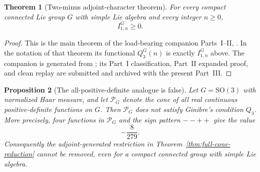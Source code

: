 \documentclass[11pt,reqno]{amsart}
\theoremstyle{plain}
\newtheorem{theorem}{Theorem}[section]
\newtheorem{proposition}[theorem]{Proposition}
\theoremstyle{definition}
\begin{document}
\begin{theorem}[Two-minus adjoint-character theorem]
\label{thm:two-minus-import}
For every compact connected Lie group $G$ with simple Lie algebra and every
integer $n\geq0$,
\[
 I^G_{1,n}\geq0.
\]
\end{theorem}

\begin{proof}
This is the main theorem of the load-bearing companion Parts~I--II,
\cite[Theorem~2.2]{AdjointTwoMinus}.  In the notation of that theorem its
functional $Q_3^G(n)$ is exactly $I^G_{1,n}$ above.  The companion is generated
from ; its Part~I classification, Part~II expanded proof, and
clean replay are submitted and archived with the present Part~III.
\end{proof}

\begin{proposition}[The all-positive-definite analogue is false]
\label{prop:all-pd-counterexample}
Let $G=\mathrm{SO}(3)$ with normalized Haar measure, and let
$\mathcal P_G$ denote the cone of all real continuous positive-definite
functions on $G$.  Then $\mathcal P_G$ does not satisfy Ginibre's
condition $Q_3$.  More precisely, four functions in $\mathcal P_G$ and the
sign pattern $--++$ give the value
\[
 -\frac8{279}.
\]
Consequently the adjoint-generated restriction in
Theorem~\ref{thm:full-cone-reduction} cannot be removed, even for a compact
connected group with simple Lie algebra.
\end{proposition}
\end{document}
